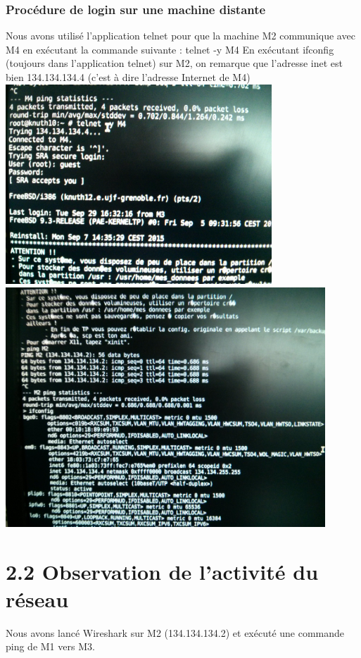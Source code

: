 \documentclass{report}
\begin{document}
\subsubsection*{Procédure de login sur une machine distante}
Nous avons utilisé l'application telnet pour que la machine M2 communique avec M4 en exécutant la commande suivante : telnet -y M4
En exécutant ifconfig (toujours dans l'application telnet) sur M2, on remarque que l'adresse inet est bien 134.134.134.4 (c'est à dire l'adresse Internet de M4)\\
\includegraphics[width=10cm]{screen2.jpg}
\\
\includegraphics[width=12cm]{screen3.jpg}

\section*{2.2 Observation de l'activité du réseau}

Nous avons lancé Wireshark sur M2 (134.134.134.2) et exécuté une commande ping de M1 vers M3.\\
\end{document}
